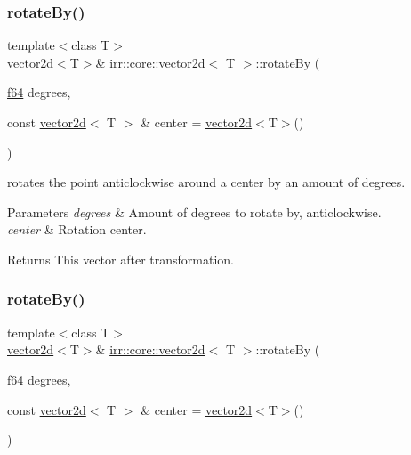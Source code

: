 \subsubsection{\texorpdfstring{rotate\+By()}{rotateBy()}\hspace{0.1cm}{\footnotesize\ttfamily [1/2]}}
{\footnotesize\ttfamily template$<$class T$>$ \\
\hyperlink{classirr_1_1core_1_1vector2d}{vector2d}$<$T$>$\& \hyperlink{classirr_1_1core_1_1vector2d}{irr\+::core\+::vector2d}$<$ T $>$\+::rotate\+By (\begin{DoxyParamCaption}\item[{\hyperlink{namespaceirr_a1325b02603ad449f92c68fc640af9b28}{f64}}]{degrees,  }\item[{const \hyperlink{classirr_1_1core_1_1vector2d}{vector2d}$<$ T $>$ \&}]{center = {\ttfamily \hyperlink{classirr_1_1core_1_1vector2d}{vector2d}$<$T$>$()} }\end{DoxyParamCaption})\hspace{0.3cm}{\ttfamily [inline]}}



rotates the point anticlockwise around a center by an amount of degrees. 


\begin{DoxyParams}{Parameters}
{\em degrees} & Amount of degrees to rotate by, anticlockwise. \\
\hline
{\em center} & Rotation center. \\
\hline
\end{DoxyParams}
\begin{DoxyReturn}{Returns}
This vector after transformation. 
\end{DoxyReturn}
\mbox{\label{classirr_1_1core_1_1vector2d_ac9c77997f6594d79d5daa5f6bf690ed2}} 
\subsubsection{\texorpdfstring{rotate\+By()}{rotateBy()}\hspace{0.1cm}{\footnotesize\ttfamily [2/2]}}
{\footnotesize\ttfamily template$<$class T$>$ \\
\hyperlink{classirr_1_1core_1_1vector2d}{vector2d}$<$T$>$\& \hyperlink{classirr_1_1core_1_1vector2d}{irr\+::core\+::vector2d}$<$ T $>$\+::rotate\+By (\begin{DoxyParamCaption}\item[{\hyperlink{namespaceirr_a1325b02603ad449f92c68fc640af9b28}{f64}}]{degrees,  }\item[{const \hyperlink{classirr_1_1core_1_1vector2d}{vector2d}$<$ T $>$ \&}]{center = {\ttfamily \hyperlink{classirr_1_1core_1_1vector2d}{vector2d}$<$T$>$()} }\end{DoxyParamCaption})\hspace{0.3cm}{\ttfamily [inline]}}



